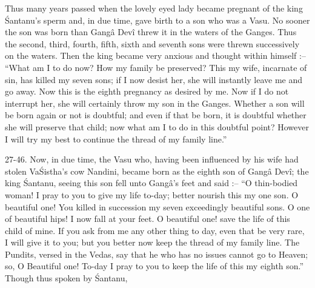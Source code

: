 Thus many years passed when the lovely eyed lady became pregnant of the king \'Santanu's sperm and, in due time, gave birth to a son who was a Vasu. No sooner the son was born than Gang\^a Dev\^i threw it in the waters of the Ganges. Thus the second, third, fourth, fifth, sixth and seventh sons were threwn successively on the waters. Then the king became very anxious and thought within himself :-- ``What am I to do now? How my family be preserved? This my wife, incarnate of sin, has killed my seven sons; if I now desist her, she will instantly leave me and go away. Now this is the eighth pregnancy as desired by me. Now if I do not interrupt her, she will certainly throw my son in the Ganges. Whether a son will be born again or not is doubtful; and even if that be born, it is doubtful whether she will preserve that child; now what am I to do in this doubtful point? However I will try my best to continue the thread of my family line.''

27-46. Now, in due time, the Vasu who, having been influenced by his wife had stolen Va\'Sistha's cow Nandini, became born as the eighth son of Gang\^a Dev\^i; the king \'Santanu, seeing this son fell unto Gang\^a's feet and said :-- ``O thin-bodied woman! I pray to you to give my life to-day; better nourish this my one son. O beautiful one! You killed in succession my seven exceedingly beautiful sons. O one of beautiful hips! I now fall at your feet. O beautiful one! save the life of this child of mine. If you ask from me any other thing to day, even that be very rare, I will give it to you; but you better now keep the thread of my family line. The Pundits, versed in the Vedas, say that he who has no issues cannot go to Heaven; so, O Beautiful one! To-day I pray to you to keep the life of this my eighth son.'' Though thus spoken by \'Santanu,

